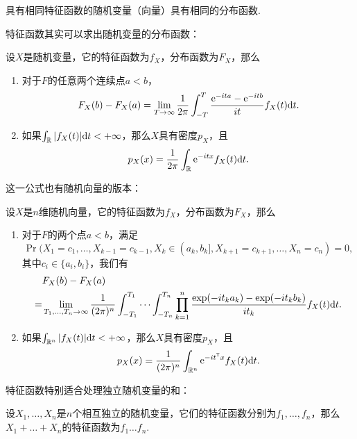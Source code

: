 \begin{theorem}\label{prop:characteristic-function-uniqueness}
具有相同特征函数的随机变量（向量）具有相同的分布函数.
\end{theorem}

特征函数其实可以求出随机变量的分布函数：
\begin{theorem}[逆转公式]\label{prop:characteristic-function}
设$X$是随机变量，它的特征函数为$f_X$，分布函数为$F_X$，那么
\begin{enumerate}
    \item 对于$F$的任意两个连续点$a<b$，
    \[F_X(b)-F_X(a)=\lim_{T\to\infty}\frac{1}{2\pi}\int_{-T}^T\frac{\mathrm{e}^{-ita}-\mathrm{e}^{-itb}}{it}f_X(t)\mathrm{d} t.\]
    \item 如果$\int_{\mathbb{R}}|f_X(t)|\mathrm{d} t<+\infty$，那么$X$具有密度$p_X$，且
    \[p_X(x)=\frac{1}{2\pi}\int_{\mathbb{R}}\mathrm{e}^{-itx}f_X(t)\mathrm{d} t.\]
\end{enumerate}
\end{theorem}

这一公式也有随机向量的版本：

\begin{theorem}\label{prop:characteristic-function-vector}
设$X$是$n$维随机向量，它的特征函数为$f_X$，分布函数为$F_X$，那么
\begin{enumerate}
    \item 对于$F$的两个点$a<b$，满足
    \[\Pr(X_1=c_1,\dots,X_{k-1}=c_{k-1},X_k\in(a_k,b_k],X_{k+1}=c_{k+1},\dots,X_n=c_n)=0,\]
    其中$c_i\in\{a_i,b_i\}$，我们有
    \begin{align*}
        &F_X(b)-F_X(a)\\
        =&\lim_{T_1,\dots,T_n\to\infty}\frac{1}{(2\pi)^n}\int_{-T_1}^{T_1}\cdots\int_{-T_n}^{T_n}\prod_{k=1}^n\frac{\exp(-it_ka_k)-\exp(-it_kb_k)}{it_k}f_X(t)\mathrm{d} t.
    \end{align*}
    \item 如果$\int_{\mathbb{R}^n}|f_X(t)|\mathrm{d} t<+\infty$，那么$X$具有密度$p_X$，且
    \[p_X(x)=\frac{1}{(2\pi)^n}\int_{\mathbb{R}^n}\mathrm{e}^{-it^{\mathsf{T}} x}f_X(t)\mathrm{d} t.\]
\end{enumerate}
\end{theorem}

特征函数特别适合处理独立随机变量的和：

\begin{theorem}\label{thm:characteristic-function-sum}
设$X_1,\dots,X_n$是$n$个相互独立的随机变量，它们的特征函数分别为$f_1,\dots,f_n$，那么$X_1+\dots+X_n$的特征函数为$f_1\dots f_n$.
\end{theorem}

